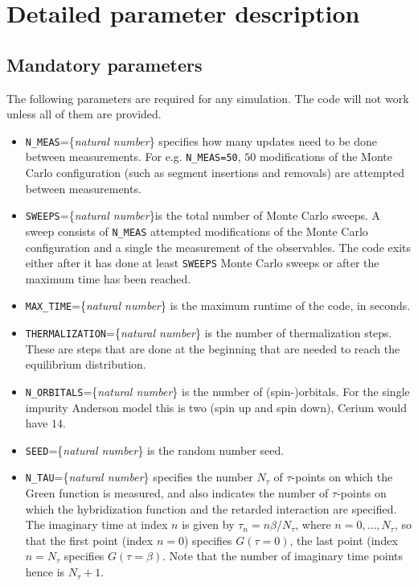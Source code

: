 \documentclass[aps,prb,floatfix,superscriptaddress,twocolumn,notitlepage]{revtex4-1}
\begin{document}
\section{Detailed parameter description}

\subsection{Mandatory parameters}
The following parameters are required for any simulation. The code will not work unless all of them are provided.

\begin{itemize}
\item \verb#N_MEAS#=\{\emph{natural number}\} specifies how many updates need to be done between measurements. For e.g. \verb#N_MEAS=50#, $50$ modifications of the Monte Carlo configuration (such as segment insertions and removals) are attempted between measurements.
\item \verb#SWEEPS#=\{\emph{natural number}\}is the total number of Monte Carlo sweeps. A sweep consists of \verb#N_MEAS# attempted modifications of the Monte Carlo configuration and a single the measurement of the observables. The code exits either after it has done at least \verb#SWEEPS# Monte Carlo sweeps or after the maximum time has been reached.
\item \verb#MAX_TIME#=\{\emph{natural number}\} is the maximum runtime of the code, in seconds.
\item \verb#THERMALIZATION#=\{\emph{natural number}\} is the number of thermalization steps. These are steps that are done at the beginning that are needed to reach the equilibrium distribution.
\item \verb#N_ORBITALS#=\{\emph{natural number}\} is the number of (spin-)orbitals. For the single impurity Anderson model this is two (spin up and spin down), Cerium would have $14$.
\item \verb#SEED#=\{\emph{natural number}\} is the random number seed. 
\item \verb#N_TAU#=\{\emph{natural number}\} specifies the number $N_{\tau}$ of $\tau$-points on which the Green function is measured, and also indicates the number of $\tau$-points on which the hybridization function and the retarded interaction are specified. The imaginary time at index $n$ is given by $\tau_{n}=n\beta/N_{\tau}$, where $n=0,\ldots,N_{\tau}$, so that the first point (index $n=0$) specifies $G(\tau=0)$, the last point (index $n=N_{\tau}$ specifies $G(\tau=\beta)$. Note that the number of imaginary time points hence is $N_{\tau}+1$.

\end{itemize}
\end{document}
